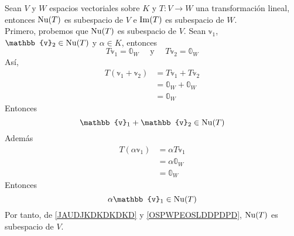 \begin{theorem}
    Sean $V$ y $W$ espacios vectoriales sobre $K$ y $T:V \longrightarrow W$ una transformación lineal, entonces $\operatorname{Nu}(T)$ es subespacio de $V$ e $\operatorname{Im}(T)$ es subespacio de $W$. \\
    \demostracion
    Primero, probemos que $\operatorname{Nu}(T)$ es subespacio de $V$. Sean $\mathbb{v}_1$, $\mathbb{v}_2 \in \Nuc(T)$ y $\alpha \in K$, entonces
    \begin{equation}
        T\mathbb{v}_1 = \mathbb{0}_W \quad \text{ y } \quad T\mathbb{v}_2 = \mathbb{0}_W
    \end{equation}
    Así,
    \begin{align*}
        T(\mathbb{v}_1 + \mathbb{v}_2) & = T\mathbb{v}_1 + T\mathbb{v}_2 \\
        & = \mathbb{0}_W + \mathbb{0}_W \\
        & = \mathbb{0}_W
    \end{align*}
    Entonces
    \begin{equation}
        \mathbb{v}_1 + \mathbb{v}_2 \in \Nuc(T) \label{JAUDJKDKDKDKD}
    \end{equation}
    Además
    \begin{align*}
        T(\alpha \mathbb{v}_1) & = \alpha T\mathbb{v}_1 \\
        & = \alpha \mathbb{0}_W \\
        & = \mathbb{0}_W
    \end{align*}
    Entonces
    \begin{equation}
        \alpha \mathbb{v}_1 \in \Nuc(T) \label{OSPWPEOSLDDPDPD}
    \end{equation}
    Por tanto, de \eqref{JAUDJKDKDKDKD} y \eqref{OSPWPEOSLDDPDPD}, $\operatorname{Nu}(T)$ es subespacio de $V$.


\end{theorem}

